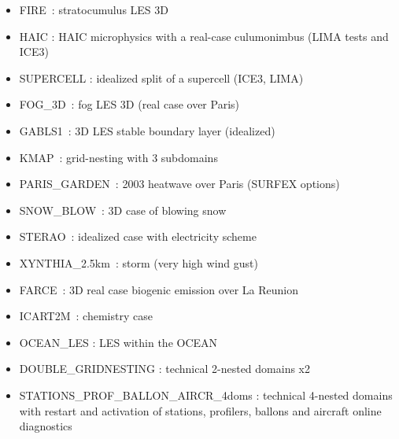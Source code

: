\begin{itemize}
\item FIRE : stratocumulus LES 3D 
\item HAIC : HAIC microphysics with a real-case culumonimbus (LIMA tests and ICE3)
\item SUPERCELL : idealized split of a supercell (ICE3, LIMA)
\item FOG\_3D : fog LES 3D (real case over Paris)
\item GABLS1 : 3D LES stable boundary layer (idealized)
\item KMAP : grid-nesting with 3 subdomains
\item PARIS\_GARDEN : 2003 heatwave over Paris (SURFEX options)
\item SNOW\_BLOW : 3D case of blowing snow
\item STERAO : idealized case with electricity scheme
\item XYNTHIA\_2.5km : storm (very high wind gust)
\item FARCE : 3D real case biogenic emission over La Reunion
\item ICART2M : chemistry case
\item OCEAN\_LES : LES within the OCEAN
\item DOUBLE\_GRIDNESTING : technical 2-nested domains x2
\item STATIONS\_PROF\_BALLON\_AIRCR\_4doms : technical 4-nested domains with restart and activation of stations, profilers, ballons and aircraft online diagnostics
\end{itemize}